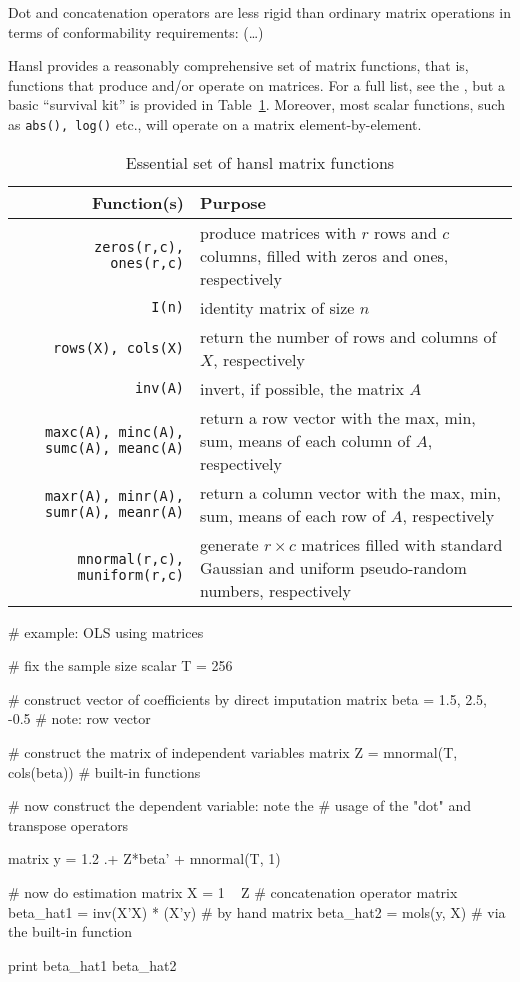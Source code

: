 Dot and concatenation operators are less rigid than ordinary matrix
operations in terms of conformability requirements: (\ldots)


Hansl provides a reasonably comprehensive set of matrix functions,
that is, functions that produce and/or operate on matrices. For a
full list, see the \GCR, but a basic ``survival kit'' is provided
in Table~\ref{tab:essential-matfuncs}.  Moreover, most scalar
functions, such as \texttt{abs(), log()} etc., will operate on a
matrix element-by-element.

\begin{table}[htbp]
  \centering
  \begin{tabular}{rp{}}
    \textbf{Function(s)} & \textbf{Purpose} \\
    \hline
    \texttt{zeros(r,c), ones(r,c)} & produce matrices with $r$ rows
    and $c$ columns, filled with zeros and ones, respectively \\
    \texttt{I(n)} & identity matrix of size $n$ \\
    \texttt{rows(X), cols(X)} & return the number of rows and columns
    of $X$, respectively \\
    \texttt{inv(A)} & invert, if possible, the matrix $A$ \\
    \texttt{maxc(A), minc(A), sumc(A), meanc(A)} & return a row vector
    with the max, min, sum, means of each column of $A$, respectively\\
    \texttt{maxr(A), minr(A), sumr(A), meanr(A)} & return a column vector
    with the max, min, sum, means of each row of $A$, respectively\\
    \texttt{mnormal(r,c), muniform(r,c)} & generate $r \times c$
    matrices filled with standard Gaussian and uniform pseudo-random
    numbers, respectively \\
    \hline
  \end{tabular}
  \caption{Essential set of hansl matrix functions}
  \label{tab:essential-matfuncs}
\end{table}


\begin{code}
# example: OLS using matrices

# fix the sample size
scalar T = 256

# construct vector of coefficients by direct imputation
matrix beta = {1.5, 2.5, -0.5} # note: row vector

# construct the matrix of independent variables
matrix Z = mnormal(T, cols(beta)) # built-in functions

# now construct the dependent variable: note the
# usage of the "dot" and transpose operators

matrix y = {1.2} .+ Z*beta' + mnormal(T, 1)

# now do estimation
matrix X = 1 ~ Z  # concatenation operator
matrix beta_hat1 = inv(X'X) * (X'y) # by hand
matrix beta_hat2 = mols(y, X)       # via the built-in function

print beta_hat1 beta_hat2
\end{code}


